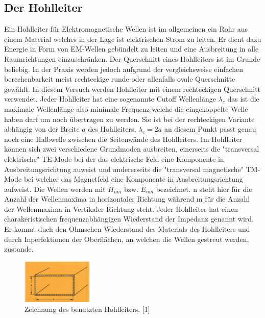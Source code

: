\subsection{Der Hohlleiter}
\label{sec:thwellenleiter}
Ein Hohlleiter für Elektromagnetische Wellen ist im allgemeinen ein Rohr aus einem Material welches in der 
Lage ist elektrischen Strom zu leiten. Er dient dazu Energie in Form von EM-Wellen gebündelt zu leiten und
eine Ausbreitung in alle Raumrichtungen einzuschränken. Der Querschnitt eines Hohlleiters ist im Grunde 
beliebig. In der Praxis werden jedoch aufgrund der vergleichsweise einfachen berechenbarkeit meist rechteckige
runde oder allenfalls ovale Querschnitte gewählt. In diesem Versuch werden Hohlleiter mit einem rechteckigen
Querschnitt verwendet. Jeder Hohlleiter hat eine sogenannte Cutoff Wellenlänge $\lambda_c$ das ist die maximale
Wellenlänge also minimale Frequenz welche die eingekoppelte Welle haben darf um noch übertragen zu werden.
Sie ist bei der rechteckigen Variante abhängig von der Breite $a$ des Hohlleiters, $\lambda_c=2a$ an diesem Punkt
passt genau noch eine Halbwelle zwischen die Seitenwände des Hohlleiters. Im Hohlleiter können sich zwei verschiedene
Grundmoden ausbreiten, einerseits die "transversal elektrische" TE-Mode bei der das elektrische Feld eine Komponente
in Ausbreitungsrichtung auweist und andererseits die "transversal magnetische" TM-Mode bei welcher das Magnetfeld
eine Komponente in Ausbreitungsrichtung aufweist. Die Wellen werden mit $H_{nm}$ bzw. $E_{nm}$
bezeichnet. n steht hier für die Anzahl der Wellenmaxima in horizontaler Richtung während m für die Anzahl der 
Wellenmaxima in Vertikaler Richtung steht. Jeder Hohlleiter hat einen charakeristischen frequenzabhängigen
Wiederstand der Impedanz genannt wird. Er kommt duch den Ohmschen Wiederstand des Materials des Hohlleiters
und durch Inperfektionen der Oberflächen, an welchen die Wellen gestreut werden, zustande.

\begin{figure}
    \centering
    \includegraphics[width=0.3\textwidth,angle=0]{content/grafiken/Hohlleiter.PNG}
    \caption{Zeichnung des benutzten Hohlleiters. [1]}
    \label{fig:Hohlleiter}
  \end{figure}

